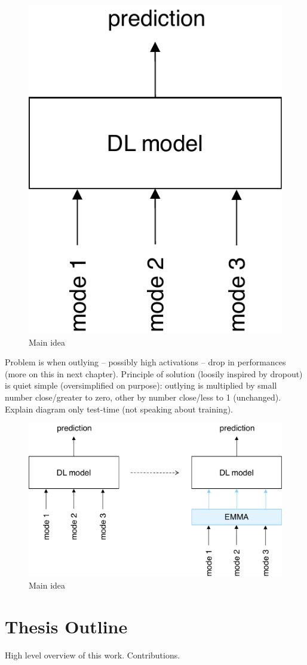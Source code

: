 \begin{figure}[!h]
\centering
\includegraphics[scale=0.5]{figures/introduction-three-modes}
\caption{Main idea}	
\label{fig:main-idea}
\end{figure}

Problem is when outlying -- possibly high activations -- drop in performances (more on this in next chapter). Principle of solution (loosily inspired by dropout) is quiet simple (oversimplified on purpose): outlying is multiplied by small number close/greater to zero, other by number close/less to 1 (unchanged). Explain diagram only test-time (not speaking about training).
\begin{figure}[!h]
\centering
\includegraphics[scale=0.5]{figures/introduction-three-modes-with-emma}
\caption{Main idea}	
\label{fig:main-idea}
\end{figure}



\section{Thesis Outline}

High level overview of this work. Contributions.